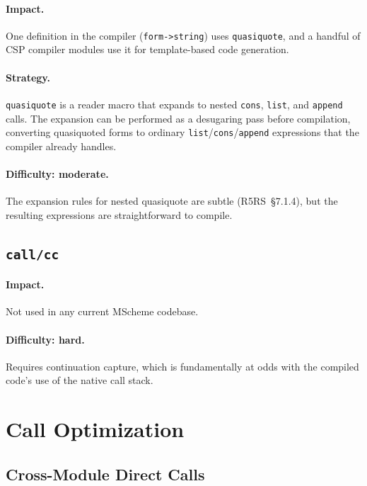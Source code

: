 \documentclass[12pt]{report}
\begin{document}
\paragraph{Impact.}
One definition in the compiler (\texttt{form->string}) uses
\texttt{quasiquote}, and a handful of CSP compiler modules
use it for template-based code generation.

\paragraph{Strategy.}
\texttt{quasiquote} is a reader macro that expands to nested
\texttt{cons}, \texttt{list}, and \texttt{append} calls.
The expansion can be performed as a desugaring pass before
compilation, converting quasiquoted forms to ordinary
\texttt{list}/\texttt{cons}/\texttt{append} expressions
that the compiler already handles.

\paragraph{Difficulty: moderate.}
The expansion rules for nested quasiquote are subtle
(R5RS~\S7.1.4), but the resulting expressions are straightforward
to compile.

\subsection{\texttt{call/cc}}
\label{sec:gap-callcc}

\paragraph{Impact.}
Not used in any current MScheme codebase.

\paragraph{Difficulty: hard.}
Requires continuation capture, which is fundamentally at odds
with the compiled code's use of the native call stack.

\section{Call Optimization}
\label{sec:gaps-calls}

\subsection{Cross-Module Direct Calls}
\label{sec:gap-cross}
\end{document}
